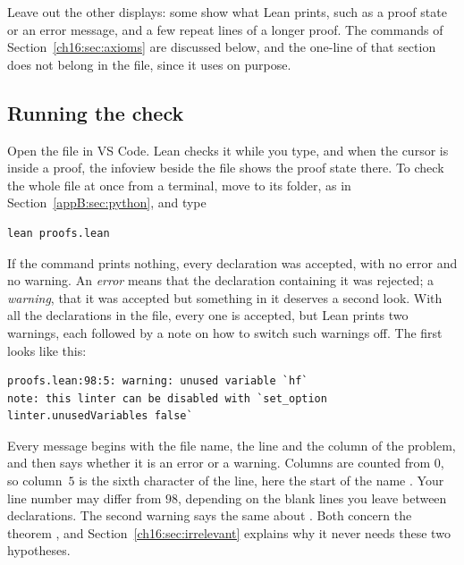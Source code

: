 Leave out the other displays: some show what Lean prints, such as a proof state or an error message, and a few repeat lines of a longer proof. The  commands of Section~\ref{ch16:sec:axioms} are discussed below, and the one-line  of that section does not belong in the file, since it uses  on purpose.

\subsection*{Running the check}
Open the file in VS Code. Lean checks it while you type, and when the cursor is inside a proof, the infoview beside the file shows the proof state there. To check the whole file at once from a terminal, move to its folder, as in Section~\ref{appB:sec:python}, and type
\par\noindent\begin{minipage}{\linewidth}
\begin{lstlisting}
lean proofs.lean
\end{lstlisting}
\end{minipage}\par
If the command prints nothing, every declaration was accepted, with no error and no warning. An \emph{error} means that the declaration containing it was rejected; a \emph{warning}, that it was accepted but something in it deserves a second look. With all the declarations in the file, every one is accepted, but Lean prints two warnings, each followed by a note on how to switch such warnings off. The first looks like this:
\par\noindent\begin{minipage}{\linewidth}
\begin{lstlisting}
proofs.lean:98:5: warning: unused variable `hf`
note: this linter can be disabled with `set_option linter.unusedVariables false`
\end{lstlisting}
\end{minipage}\par
Every message begins with the file name, the line and the column of the problem, and then says whether it is an error or a warning. Columns are counted from $0$, so column~$5$ is the sixth character of the line, here the start of the name . Your line number may differ from $98$, depending on the blank lines you leave between declarations. The second warning says the same about . Both concern the theorem , and Section~\ref{ch16:sec:irrelevant} explains why it never needs these two hypotheses.

